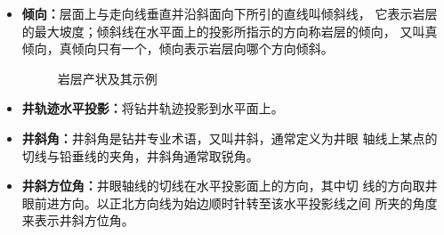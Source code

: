 \documentclass[a4paper,twoside]{ctexart}
\begin{document}
\begin{itemize}
\item \textbf{倾向：}层面上与走向线垂直并沿斜面向下所引的直线叫倾斜线，
  它表示岩层的最大坡度；倾斜线在水平面上的投影所指示的方向称岩层的倾向，
  又叫真倾向，真倾向只有一个，倾向表示岩层向哪个方向倾斜。

\begin{figure}[htbp]
  \centering
  \hspace{2cm}
  
  \caption{岩层产状及其示例}
  \label{fig:岩层产状及其示例}
\end{figure}

\item \textbf{井轨迹水平投影：}将钻井轨迹投影到水平面上。
\item \textbf{井斜角：}井斜角是钻井专业术语，又叫井斜，通常定义为井眼
  轴线上某点的切线与铅垂线的夹角，井斜角通常取锐角。
\item \textbf{井斜方位角：}井眼轴线的切线在水平投影面上的方向，其中切
  线的方向取井眼前进方向。以正北方向线为始边顺时针转至该水平投影线之间
  所夹的角度来表示井斜方位角。


\end{itemize}
\end{document}
